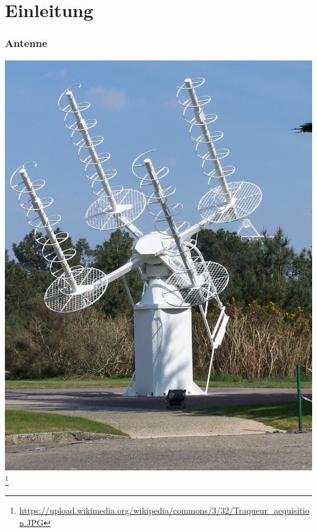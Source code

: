 

\subtitle{Technik 11: \\
           Antennentechnik \\[2em]}
\date{Stand 30.11.2014}




\section*{Einleitung}

\begin{frame}
    \frametitle{Antenne}
      \begin{center}
        \includegraphics[width=.5\textwidth]{e11/Traqueur_acquisition.JPG}
        \footnote{\tiny \url{https://upload.wikimedia.org/wikipedia/commons/3/32/Traqueur_acquisition.JPG}}
    \end{center}
\end{frame}
  
